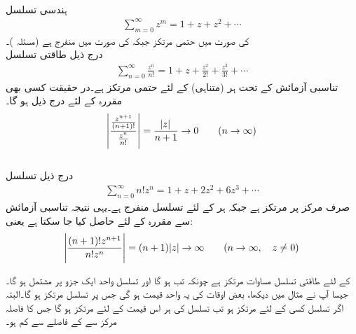 \quad {}\\
ہندسی تسلسل
\begin{align*}
\sum\limits_{m=0}^{\infty} z^m=1+z+z^2+\cdots
\end{align*}
 کی صورت میں حتمی مرتکز جبکہ  کی صورت میں منفرج  ہے (مسئلہ )۔
\quad {}\\
درج ذیل طاقتی تسلسل
\begin{align*}
\sum\limits_{n=0}^{\infty} \frac{z^n}{n!}=1+z+\frac{z^2}{2!}+\frac{z^3}{3!}+\cdots
\end{align*}
تناسبی آزمائش کے تحت ہر (متناہی)  کے لئے حتمی مرتکز ہے۔در حقیقت کسی بھی مقررہ  کے لئے درج ذیل ہو گا۔
\begin{align*}
\abs{\frac{\tfrac{z^{n+1}}{(n+1)!}}{\tfrac{z^n}{n!}}}=\frac{\abs{z}}{n+1}\to 0 \quad \quad (n\to \infty)
\end{align*}
\quad {}\\
درج ذیل تسلسل
\begin{align*}
\sum\limits_{n=0}^{\infty} n! z^n=1+z+2z^2+6z^3+\cdots
\end{align*}
صرف مرکز  پر مرتکز ہے جبکہ ہر  کے لئے  تسلسل منفرج ہے۔یہی نتیجہ تناسبی آزمائش سے مقررہ  کے لئے حاصل کیا جا سکتا ہے یعنی:
\begin{align*}
\abs{\frac{(n+1)!z^{n+1}}{n!z^n}}=(n+1)\abs{z}\to \infty \quad \quad (n\to \infty,\quad z\ne 0)
\end{align*}

 کے لئے طاقتی تسلسل مساوات   مرتکز ہے چونکہ تب  ہو گا اور تسلسل واحد ایک جزو  پر مشتمل ہو گا۔ جیسا آپ نے مثال  میں دیکھا، بعض اوقات  کی یہ واحد قیمت ہو گی جس پر تسلسل مرتکز ہو گا۔البتہ اگر تسلسل  کسی  کے لئے مرتکز ہو تب تسلسل  کی ہر اس قیمت کے لئے مرتکز ہو گا  جس کا فاصلہ مرکز سے   کے فاصلے سے کم ہو۔

